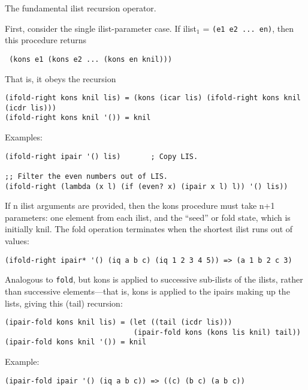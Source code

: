 \begin{entry}{%
  }

The fundamental ilist recursion operator.

  First, consider the single ilist-parameter case. If ilist$_1$ =
  \texttt{(e1\ e2\ ...\ en)}, then this procedure returns

  \texttt{\ (kons\ e1\ (kons\ e2\ ...\ (kons\ en\ knil)))}

  That is, it obeys the recursion

\begin{verbatim}
(ifold-right kons knil lis) = (kons (icar lis) (ifold-right kons knil (icdr lis)))
(ifold-right kons knil '()) = knil
\end{verbatim}

  Examples:

\begin{verbatim}
(ifold-right ipair '() lis)       ; Copy LIS.

;; Filter the even numbers out of LIS.
(ifold-right (lambda (x l) (if (even? x) (ipair x l) l)) '() lis))
\end{verbatim}

  If n ilist arguments are provided, then the kons procedure must take
  n+1 parameters: one element from each ilist, and the ``seed'' or
  fold state, which is initially knil. The fold operation terminates
  when the shortest ilist runs out of values:

\begin{verbatim}
(ifold-right ipair* '() (iq a b c) (iq 1 2 3 4 5)) => (a 1 b 2 c 3)
\end{verbatim}
\end{entry}

\begin{entry}{%
  }

  Analogous to \texttt{fold}, but kons is
  applied to successive sub-ilists of the ilists, rather than
  successive elements---that is, kons is applied to the ipairs
  making up the lists, giving this (tail) recursion:

\begin{verbatim}
(ipair-fold kons knil lis) = (let ((tail (icdr lis)))
                              (ipair-fold kons (kons lis knil) tail))
(ipair-fold kons knil '()) = knil
\end{verbatim}

  Example:

\begin{verbatim}
(ipair-fold ipair '() (iq a b c)) => ((c) (b c) (a b c))
\end{verbatim}
\end{entry}

